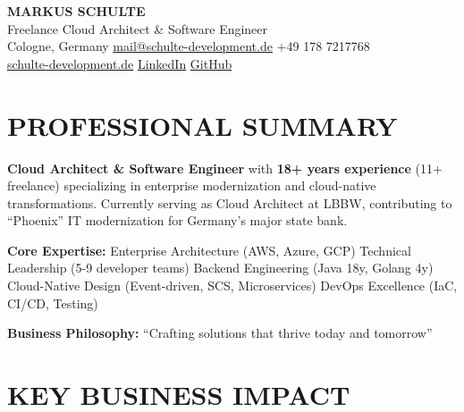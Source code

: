 \documentclass[11pt,a4paper]{article}
\begin{document}
{\centering
{\Huge\bfseries\color{primaryblue} MARKUS SCHULTE}\\[4pt]
{\Large\color{darkgray} Freelance Cloud Architect \& Software Engineer}\\[8pt]
\color{lightgray}
Cologne, Germany \textbar{} \href{mailto:mail@schulte-development.de}{mail@schulte-development.de} \textbar{} +49 178 7217768\\
\href{https://schulte-development.de}{schulte-development.de} \textbar{} \href{https://linkedin.com/in/markus-schulte}{LinkedIn} \textbar{} \href{https://github.com/SchulteDev}{GitHub}\\[12pt]
}

\section{PROFESSIONAL SUMMARY}

\textbf{Cloud Architect \& Software Engineer} with \textbf{18+ years experience} (11+ freelance) specializing in enterprise modernization and cloud-native transformations. Currently serving as Cloud Architect at LBBW, contributing to ``Phoenix'' IT modernization for Germany's major state bank.

\vspace{6pt}
\textbf{Core Expertise:} Enterprise Architecture (AWS, Azure, GCP) \textbar{} Technical Leadership (5-9 developer teams) \textbar{} Backend Engineering (Java 18y, Golang 4y) \textbar{} Cloud-Native Design (Event-driven, SCS, Microservices) \textbar{} DevOps Excellence (IaC, CI/CD, Testing)

\vspace{6pt}
\textbf{Business Philosophy:} ``Crafting solutions that thrive today and tomorrow''

\section{KEY BUSINESS IMPACT}
\end{document}
